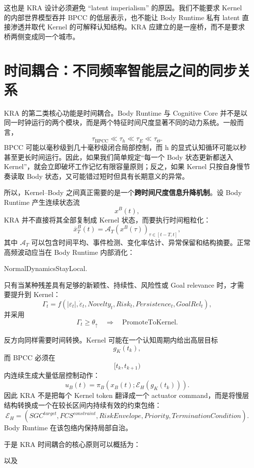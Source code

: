 这也是 KRA 设计必须避免 ``latent imperialism'' 的原因。我们不能要求 Kernel 的内部世界模型吞并 BPCC 的低层表示，也不能让 Body Runtime 私有 latent 直接渗透并取代 Kernel 的可解释认知结构。KRA 应建立的是一座桥，而不是要求桥两侧变成同一个城市。

\section{时间耦合：不同频率智能层之间的同步关系}
\label{sec:kra-temporal-coupling}

KRA 的第二类核心功能是时间耦合。Body Runtime 与 Cognitive Core 并不是以同一时钟运行的两个模块，而是两个特征时间尺度显著不同的动力系统。一般而言，
\[
\tau_{\mathrm{BPCC}}
\ll
\tau_h
\ll
\tau_E
\ll
\tau_\Theta.
\]
BPCC 可能以毫秒级到几十毫秒级闭合局部控制，而 h 的显式认知循环可能以秒甚至更长时间运行。因此，如果我们简单规定``每一个 Body 状态更新都送入 Kernel''，就会立即破坏工作记忆有限容量原则；反之，如果 Kernel 只按自身慢节奏读取 Body 状态，又可能错过短时但具有长期意义的异常。

所以，Kernel--Body 之间真正需要的是一个\textbf{跨时间尺度信息升降机制}。设 Body Runtime 产生连续状态流
\[
x^B(t),
\]
KRA 并不直接将其全部复制成 Kernel 状态，而要执行时间粗粒化：
\[
\bar x^B_T(t)
=
\mathcal A_T
\left(
x^B(\tau)
\right)_{\tau\in[t-T,t]},
\]
其中 $\mathcal A_T$ 可以包含时间平均、事件检测、变化率估计、异常保留和结构摘要。正常高频波动应当在 Body Runtime 内部消化：
\begin{statementbox}
NormalDynamicsStayLocal.
\end{statementbox}
只有当某种残差具有足够的新颖性、持续性、风险性或 Goal relevance 时，才需要提升到 Kernel：
\[
\Gamma_t
=
f
\left(
|\varepsilon_t|,
\dot\varepsilon_t,
Novelty_t,
Risk_t,
Persistence_t,
GoalRel_t
\right),
\]
并采用
\[
\Gamma_t\geq\theta_{\uparrow}
\quad\Rightarrow\quad
\mathrm{PromoteToKernel}.
\]

反方向同样需要时间转换。Kernel 可能在一个认知周期内给出高层目标
\[
g_K(t_k),
\]
而 BPCC 必须在
\[
[t_k,t_{k+1})
\]
内连续生成大量低层控制动作：
\[
u_B(t)
=
\pi_B
\left(
x_B(t);
\mathcal E_H(g_K(t_k))
\right).
\]
因此 KRA 不是把每个 Kernel token 翻译成一个 actuator command，而是将慢层结构转换成一个在较长区间内持续有效的约束包络：
\[
\boxed{
\mathcal E_H
=
\left(
SGC^{target},
FCS^{constraint},
RiskEnvelope,
Priority,
TerminationCondition
\right).
}
\]
Body Runtime 在该包络内保持局部自治。

于是 KRA 时间耦合的核心原则可以概括为：
\begin{statementbox}
\centering
{}
\end{statementbox}
以及
\begin{statementbox}
\centering
{}
\end{statementbox}

